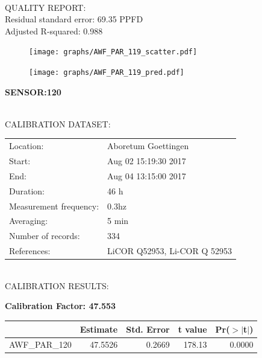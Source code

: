 \documentclass[oneside]{report}
\begin{document}
\hrulefill\\
QUALITY REPORT:\\
Residual standard error: 69.35 PPFD\\
Adjusted R-squared: 0.988



\begin{figure}[H]
  \centering
  \texttt{[image: graphs/AWF\_PAR\_119\_scatter.pdf]}
\end{figure}




\begin{figure}[H]
  \centering
  \texttt{[image: graphs/AWF\_PAR\_119\_pred.pdf]}
\end{figure}

\pagebreak


\begin{center}
\large{\textbf{SENSOR:120}}\\
\end{center}

\hrulefill\\
CALIBRATION DATASET:\\
\begin{table}[h!]
  \centering
  \label{tab:table1}
  \begin{tabular}{ll}
    Location: & Aboretum Goettingen\\ 
    
    
    Start:  & Aug 02 15:19:30 2017 \\
    End:   & Aug 04 13:15:00 2017\\ 
    Duration: & 46 h\\
    Measurement frequency: & 0.3hz\\
    Averaging:  &5 min\\
    Number of records: & 334 \\
    References: & LiCOR Q52953, Li-COR Q 52953 \\
  \end{tabular}
\end{table}

\hrulefill\\
CALIBRATION RESULTS:\\


\begin{center}
\textbf{\large{Calibration Factor: 47.553}}\\
\end{center}
\begin{table}[ht]
\centering
\begin{tabular}{rrrrr}
  \hline
 & Estimate & Std. Error & t value & Pr($>$$|$t$|$) \\ 
  \hline
AWF\_PAR\_120 & 47.5526 & 0.2669 & 178.13 & 0.0000 \\ 
   \hline
\end{tabular}
\end{table}
\end{document}
